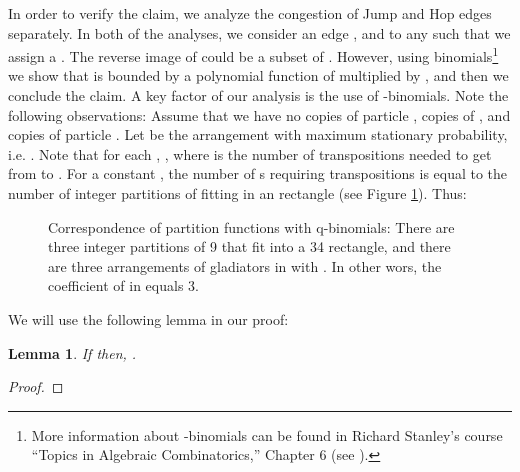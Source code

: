 \documentclass[10 pt]{article}
\newtheorem{lemma}[thm]{Lemma}
\begin{document}
In order to verify the claim, we analyze the congestion of  Jump and Hop edges separately. In both of the analyses, we consider an
edge , and to any  such that  we assign a .
The reverse image of  could be a subset of . However, using
binomials\footnote{More information about -binomials can be found in Richard Stanley's course ``Topics in Algebraic Combinatorics,''
Chapter 6 (see \cite{Stanley}). }
we show that  is bounded by a polynomial function of
 multiplied by , and then we conclude the claim. A key factor of our analysis is the use of -binomials.
Note the following observations:
Assume that we have no copies of particle ,  copies of , and  copies of particle . Let  be the
arrangement with maximum stationary probability, i.e. . Note that for each , ,
where  is the number of transpositions needed to get from  to . For a constant , the number of s requiring 
transpositions is equal to the number of integer partitions of  fitting  in an  rectangle (see Figure \ref{qbin}). Thus:
 
\begin{figure}[!h]




\caption{Correspondence of partition functions with q-binomials: There are three integer partitions of 9 that fit into a 34 rectangle,
and there are three arrangements of gladiators in  with . In other wors, the coefficient
of  in  equals 3.}\label{qbin}
\end{figure}
We will use the following lemma in our proof:
\begin{lemma}\label{qlemma}
 If  then, .
\end{lemma}
\begin{proof}


\end{proof}
\end{document}
